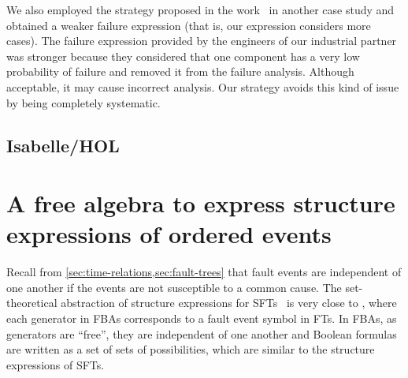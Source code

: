 \documentclass[12pt,openright,twoside,a4paper,oldfontcommands,english,brazil,final]{abntex2}
\theoremstyle{theo}
\begin{document}
We also employed the strategy proposed in the work~\cite{DM2012} in another case study and obtained a weaker failure expression (that is, our expression considers more cases).
The failure expression provided by the engineers of our industrial partner was stronger because they considered that one component has a very low probability of failure and removed it from the failure analysis.
Although acceptable, it may cause incorrect analysis.
Our strategy avoids this kind of issue by being completely systematic.

\section{Isabelle/HOL}
\label{sec:isabelle}




\chapter{A free algebra to express structure expressions of ordered events}
\label{chap:algebra}



Recall from \cref{sec:time-relations,sec:fault-trees} that fault events are independent of one another if the events are not susceptible to a common cause.
The set-theoretical abstraction of structure expressions for \acp{SFT}~\cite[pp. VI-11]{VGR+1981} is very close to , where each generator in \acp{FBA} corresponds to a fault event symbol in \aclp{FT}.
In \acp{FBA}, as generators are ``free'', they are independent of one another and Boolean formulas are written as a set of sets of possibilities, which are similar to the structure expressions of \acp{SFT}.
\end{document}
